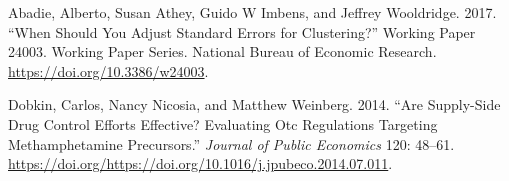 \documentclass[
  11pt,
]{article}
\newlength{\cslhangindent}
\newenvironment{cslreferences}%
  {\setlength{\parindent}{0pt}%
  \everypar{\setlength{\hangindent}{\cslhangindent}}\ignorespaces}%
  {\par}
\begin{document}
\hypertarget{refs}{}
\begin{cslreferences}
\leavevmode\hypertarget{ref-Abadie2017}{}%
Abadie, Alberto, Susan Athey, Guido W Imbens, and Jeffrey Wooldridge.
2017. ``When Should You Adjust Standard Errors for Clustering?'' Working
Paper 24003. Working Paper Series. National Bureau of Economic Research.
\url{https://doi.org/10.3386/w24003}.

\leavevmode\hypertarget{ref-DOBKIN201448}{}%
Dobkin, Carlos, Nancy Nicosia, and Matthew Weinberg. 2014. ``Are
Supply-Side Drug Control Efforts Effective? Evaluating Otc Regulations
Targeting Methamphetamine Precursors.'' \emph{Journal of Public
Economics} 120: 48--61.
\url{https://doi.org/https://doi.org/10.1016/j.jpubeco.2014.07.011}.
\end{cslreferences}
\end{document}

